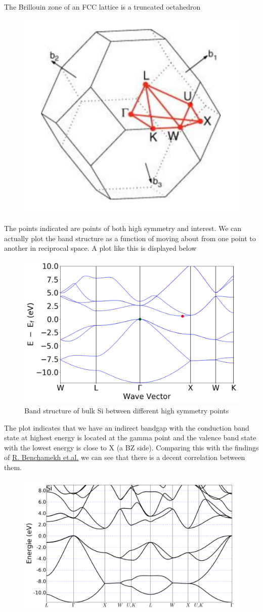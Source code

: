 \documentclass[a4paper,10pt]{article}
\begin{document}
The Brillouin zone of an FCC lattice is a truncated octahedron
\begin{figure}[H]
	\centering
	\includegraphics[width=0.7\linewidth]{reciprocal}
	\caption{}
	\label{fig:reciprocal}
\end{figure}
\newpage
The points indicated are points of both high symmetry and interest.
We can actually plot the band structure as a function of moving about from one point to another in reciprocal space. A plot like this is displayed below
\begin{figure}[H]
	\centering
	\includegraphics[width=0.7\linewidth]{bandstruct}
	\caption{Band structure of bulk Si between different high symmetry points}
	\label{fig:bandstruct}
\end{figure}
The plot indicates that we have an indirect bandgap with the conduction band state at highest energy is located at the gamma point and the valence band state with the lowest energy is close to X (a BZ side).
Comparing this with the findings of \href{https://www.researchgate.net/publication/270895624_Microscopic_electronic_wave_function_and_interactions_between_quasiparticles_in_empirical_tight-binding_theory}{R. Benchamekh et.al.} we can see that there is a decent correlation between them.
\begin{figure}[H]
	\centering
	\includegraphics[width=0.7\linewidth]{si_band}
	\caption{}
	\label{fig:siband}
\end{figure}
\end{document}
